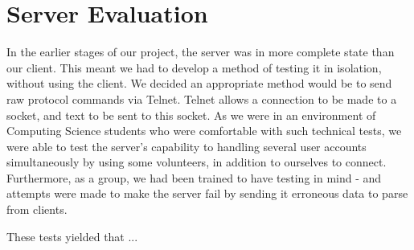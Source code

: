 \section{Server Evaluation}
\label{server_eval}

In the earlier stages of our project, the server was in more complete state than our client. This meant we had to develop a method of testing it in isolation, without using the client. We decided an appropriate method would be to send raw protocol commands via Telnet. Telnet allows a connection to be made to a socket, and text to be sent to this socket. As we were in an environment of Computing Science students who were comfortable with such technical tests, we were able to test the server's capability to handling several user accounts simultaneously by using some volunteers, in addition to ourselves to connect. Furthermore, as a group, we had been trained to have testing in mind - and attempts were made to make the server fail by sending it erroneous data to parse from clients.

These tests yielded that ...  
